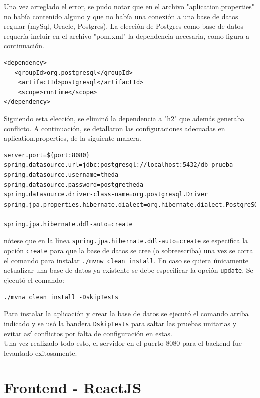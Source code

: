 \documentclass{article}
\begin{document}
	Una vez arreglado el error, se pudo notar que en el archivo 
	"aplication.properties" no había contenido alguno y que no había una 
	conexión a una base de datos regular (mySql, Oracle, Postgres). La 
	elección de Postgres como base de datos requería incluir en el archivo 
	"pom.xml" la dependencia necesaria, como figura a continuación.

	\begin{lstlisting}
<dependency>
   <groupId>org.postgresql</groupId>
	<artifactId>postgresql</artifactId>
	<scope>runtime</scope>
</dependency>
	\end{lstlisting}
	
	Siguiendo esta elección, se eliminó la dependencia a "h2" que además 
	generaba conflicto. A continuación, se detallaron las configuraciones 
	adecuadas en aplication.properties, de la siguiente manera.
	
\begin{lstlisting}
server.port=${port:8080}
spring.datasource.url=jdbc:postgresql://localhost:5432/db_prueba
spring.datasource.username=theda
spring.datasource.password=postgretheda
spring.datasource.driver-class-name=org.postgresql.Driver
spring.jpa.properties.hibernate.dialect=org.hibernate.dialect.PostgreSQLDialect

spring.jpa.hibernate.ddl-auto=create
\end{lstlisting}

	nótese que en la línea \texttt{spring.jpa.hibernate.ddl-auto=create} se 
	especifica la opción \texttt{create} para que la base de datos se cree 
	(o sobreescriba) una vez se corra el comando para instalar 
	\texttt{./mvnw clean install}. En caso se quiera únicamente actualizar 
	una base de datos ya existente se debe especificar la opción 
	\texttt{update}. Se ejecutó el comando:

\begin{lstlisting}
./mvnw clean install -DskipTests
\end{lstlisting}

	Para instalar la aplicación y crear la base de datos se ejecutó el 
	comando arriba indicado y se usó la bandera 
	\texttt{DskipTests} para saltar las pruebas unitarias y evitar así 
	conflictos por falta de configuración en estas. \\
	
	Una vez realizado todo esto, el servidor en el puerto 8080 para el 
	backend fue levantado exitosamente.
	
	\section*{Frontend - ReactJS}
	
\end{document}

